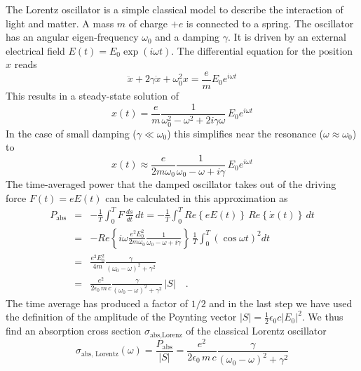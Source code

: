 The Lorentz oscillator is a simple classical model to describe the interaction of light and matter. A mass $m$ of charge $+e$ is connected to a spring. The oscillator has an angular eigen-frequency $\omega_0$ and a damping $\gamma$. It is driven by an external electrical field $E(t) = E_0 \exp(i \omega t)$. The differential equation for the position $x$ reads
\begin{equation}
  \ddot{x} + 2  \gamma  \dot{x} + \omega_0^2 x =  \frac{e}{m} E_0 e^{i \omega t}
\end{equation}
This results in a steady-state solution of 
\begin{equation}
  x(t) = \frac{e}{m}  \frac{1}{\omega_0^2 - \omega^2 + 2  i \gamma \omega } \, E_0 e^{i \omega t} 
\end{equation}
In the case of small damping ($\gamma \ll \omega_0$) this simplifies near the resonance ($\omega \approx \omega_0$) to
\begin{equation}
  x(t) \approx \frac{e}{2 m \omega_0}  \frac{1}{\omega_0 - \omega + i \gamma } \, E_0 e^{i \omega t} 
\end{equation}
The time-averaged power  that the damped oscillator takes out of the driving force $F(t) = e E(t)$ can be calculated in this approximation as
%
\begin{eqnarray}
 P_{\text{abs}} &= &  - \frac{1}{T} \int_0^T F \, \frac{ds}{dt} \, dt =  
  - \frac{1}{T}  \int_0^T Re \left\{  e E(t) \right\}  \, Re \left\{ \dot{x}(t) \right\} \, dt \\
  & = & - Re \left\{i \omega  \frac{e^2  E_0^2 }{2 m \omega_0}  \frac{1}{\omega_0 - \omega +  i \gamma } \right\}  \,   \frac{1}{T}  \int_0^T \left( \cos \omega t \right)^2 dt \\
%
& = & \frac{e^2 E_0^2  }{4 m }  \frac{\gamma }{(\omega_0 - \omega)^2 +  \gamma ^2}  \\
&  = &  \frac{e^2  }{2 \epsilon_0 \, m \,c }  \frac{\gamma }{(\omega_0 - \omega)^2 +  \gamma ^2}  \, |S|  \quad .
\end{eqnarray}
%
The time average has produced a factor of $1/2$ and in the last step we have used the definition of the amplitude of the Poynting vector $|S| = \frac{1}{2} \epsilon_0 c |E_0|^2$. 
We thus find an absorption cross section $\sigma_{\text{abs,Lorenz}}$ of the classical Lorentz oscillator
\begin{equation}
 \sigma_{\text{abs, Lorentz}}(\omega) = \frac{ P_{\text{abs}} }{|S| } = \frac{e^2  }{2 \epsilon_0 \,  m \, c}  \frac{\gamma }{(\omega_0 - \omega)^2 +  \gamma ^2} 
\end{equation}

